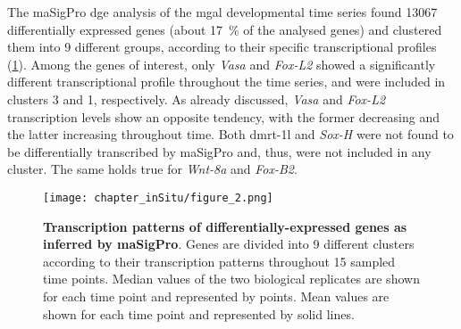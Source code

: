 The maSigPro \gls{dge} analysis of the \gls{mgal} developmental time series found \num{13067} differentially expressed genes (about \qty{17}{\percent} of the analysed genes) and clustered them into 9 different groups, according to their specific transcriptional profiles (\cref{fig:masigpro}). Among the genes of interest, only \textit{Vasa} and \textit{Fox-L2} showed a significantly different transcriptional profile throughout the time series, and were included in clusters 3 and 1, respectively. As already discussed, \textit{Vasa} and \textit{Fox-L2} transcription levels show an opposite tendency, with the former decreasing and the latter increasing throughout time. Both \gls{dmrt-1l} and \textit{Sox-H} were not found to be differentially transcribed by maSigPro and, thus, were not included in any cluster. The same holds true for \textit{Wnt-8a} and \textit{Fox-B2}.

\begin{figure}[t!]
	\centering
	\texttt{[image: chapter\_inSitu/figure\_2.png]}
	\caption[\textbf{Transcription patterns of differentially-expressed genes as inferred by maSigPro}]
	{
		\textbf{Transcription patterns of differentially-expressed genes as inferred by maSigPro}. Genes are divided into 9 different clusters according to their transcription patterns throughout 15 sampled time points. Median values of the two biological replicates are shown for each time point and represented by points. Mean values are shown for each time point and represented by solid lines.
	}
	\label{fig:masigpro}
\end{figure}

